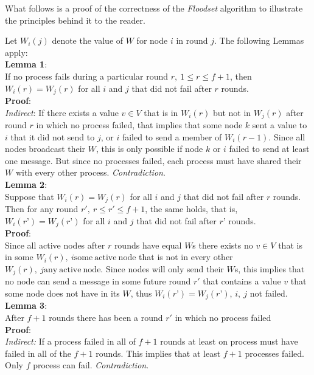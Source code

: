 \documentclass[fleqn]{article}
\begin{document}
\noindent What follows is a proof of the correctness of the \textit{Floodset} algorithm to illustrate the principles behind it to the reader.

Let $W_i(j)$ denote the value of $W$ for node $i$ in round $j$. The following Lemmas apply:\\

\noindent \textbf{Lemma 1}:\\
If no process fails during a particular round $r,\ 1 \le r \le f + 1$, then $W_i(r) = W_j(r)$ for all $i$ and $j$ that did not fail after $r$ rounds.\\
\textbf{Proof}:\\
\textit{Indirect}: If there exists a value $v \in V$ that is in $W_i(r)$ but not in $W_j(r)$ after round $r$ in which no process failed, that implies that some node $k$ sent a value to $i$ that it did not send to $j$, or $i$ failed to send a member of $W_i(r-1)$. Since all nodes broadcast their $W$, this is only possible if node $k$ or $i$ failed to send at least one message. But since no processes failed, each process must have shared their $W$ with every other process. \textit{Contradiction}. \\

\noindent \textbf{Lemma 2}:\\
Suppose that $W_i(r) = W_j(r)$ for all $i$ and $j$ that did not fail after $r$ rounds. Then for any round $r',\ r \le r' ≤ f + 1$, the same holds, that is, $W_i(r’) = W_j(r’)$ for all $i$ and $j$ that did not fail after $r’$ rounds.\\
\textbf{Proof}:\\
Since all active nodes after $r$ rounds have equal $W$s there exists no $v \in V$ that is in some $W_i(r),\ i \mathrm{some\ active\ node}$ that is not in every other $W_j(r),\ j \mathrm{any\ active\ node}$.
Since nodes will only send their $W$s, this implies that no node can send a message in some future round $r'$ that contains a value $v$ that some node does not have in its $W$, thus $W_i(r’) = W_j(r’)$, $i,\ j$ not failed.\\

\noindent \textbf{Lemma 3}:\\
After $f+1$ rounds there has been a round $r'$ in which no process failed\\
\textbf{Proof}:\\
\textit{Indirect:} If a process failed in all of $f+1$ rounds at least on process must have failed in all of the $f+1$ rounds. This implies
that at least $f+1$ processes failed. Only $f$ process can fail. \textit{Contradiction}.\\
\end{document}
